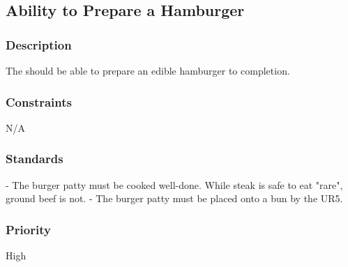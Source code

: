 \subsection{Ability to Prepare a Hamburger}
\subsubsection{Description}
The \productname{} should be able to prepare an edible hamburger to completion. 
\subsubsection{Constraints}
N/A
\subsubsection{Standards}
- The burger patty must be cooked well-done. While steak is safe to eat "rare", ground beef is not. 
- The burger patty must be placed onto a bun by the UR5.   
\subsubsection{Priority}
High
